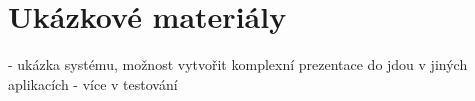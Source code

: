 








\section{Ukázkové materiály}\label{text:realizace/vytvoreneMaterialy}

- ukázka systému, možnost vytvořit komplexní prezentace do jdou v jiných aplikacích
- více v testování